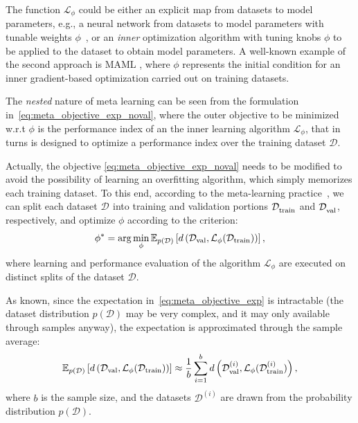 \documentclass{article}
\newcommand{\diss}{d}
\newcommand{\learn}{\mathcal{L}}
\newcommand{\D}{\mathcal{D}}
\newcommand{\E}{\mathbb{E}}
\begin{document}
The function $\learn_\phi$ could be either an explicit map from datasets to model parameters, e.g., a neural network  from datasets to model parameters with tunable weights $\phi$~\cite{gordon2018metalearning},
or an \emph{inner} optimization algorithm with tuning knobs $\phi$ to be applied to the dataset to obtain model parameters.  
A well-known example of the second approach is  MAML \cite{finn2017model}, where $\phi$ represents the initial condition for an inner gradient-based optimization carried out on training datasets. 




The \emph{nested} nature of meta learning can be seen from the formulation in~\eqref{eq:meta_objective_exp_noval}, where the outer objective
to be minimized w.r.t $\phi$ is the performance index of an the inner learning algorithm $\learn_\phi$, that in turns is designed to optimize a performance index over the training dataset $\D$. 

Actually, the objective \eqref{eq:meta_objective_exp_noval}
needs to be modified to avoid the possibility of learning 
an overfitting algorithm, which 
simply memorizes each training dataset.
To this end, according to the meta-learning practice~\cite{hospedales2021meta},  we can split each dataset $\D^{}$ into training and validation 
portions $\D^{}_{\rm train}$ and $\D^{}_{\rm val}$, respectively, and optimize $\phi$ according to the 
criterion:
\begin{equation}
	\label{eq:meta_objective_exp}
    \phi^{*} = \arg \min_\phi 
  \E_{p(\D)} \left [ \diss\left (\D_{\rm val}, \learn_\phi(\D_{\rm train})\right ) \right],
\end{equation}
where learning and performance evaluation of the algorithm $\learn_\phi$ are executed on distinct splits of the dataset $\D$.
 



As known,  since the expectation in~\eqref{eq:meta_objective_exp} is intractable (the dataset distribution $p(\D)$ may be very complex, and it may only available through samples anyway), the  expectation is approximated
through the sample average:
\begin{equation}
	\label{eq:meta_objective_mc}
  \E_{p(\D)} \left [ \diss\left (\D_{\rm val}, \learn_\phi(\D_{\rm train})\right ) \right]  \approx  \frac{1}{b} \sum_{i=1}^b 
 \diss\left (\D^{(i)}_{\rm val}, \learn_\phi(\D^{(i)}_{\rm train})\right ), 
\end{equation}
where $b$ is the sample  size, and  the datasets  $\D^{(i)}$ are drawn from the probability distribution $p(\D)$. 
\end{document}
